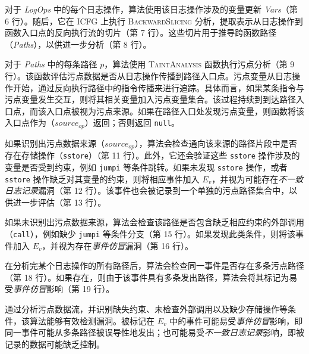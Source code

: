 对于 \textit{LogOps} 中的每个日志操作，算法使用该日志操作涉及的变量更新 \textit{Vars}（第 6 行）。随后，它在 ICFG 上执行 \textsc{BackwardSlicing} 分析，提取表示从日志操作到函数入口点的反向执行流的切片（第 7 行）。这些切片用于推导跨函数路径（\textit{Paths}），以供进一步分析（第 8 行）。

对于 \textit{Paths} 中的每条路径 \(p\)，算法使用 \textsc{TaintAnalysis} 函数执行污点分析（第 9 行）。该函数评估污点数据是否从日志操作传播到路径入口点。污点变量从日志操作开始，通过反向执行路径中的指令传播来进行追踪。具体而言，如果某条指令与污点变量发生交互，则将其相关变量加入污点变量集合。该过程持续到到达路径入口点，而该入口点被视为污点来源。如果在路径入口处发现污点变量，则函数将该入口点作为（\(source_{op}\)）返回；否则返回 \texttt{null}。

如果识别出污点数据来源（\(source_{op}\)），算法会检查通向该来源的路径片段中是否存在存储操作（\texttt{sstore}）（第 11 行）。此外，它还会验证这些 \texttt{sstore} 操作涉及的变量是否受到约束，例如 \texttt{jumpi} 等条件跳转。如果未发现 \texttt{sstore} 操作，或者 \texttt{sstore} 操作缺乏对其变量的约束，则将相应事件加入 \(E_v\)，并视为可能存在\emph{不一致日志记录}漏洞（第 12 行）。该事件也会被记录到一个单独的污点路径集合中，以供进一步评估（第 13 行）。

如果未识别出污点数据来源，算法会检查该路径是否包含缺乏相应约束的外部调用（\texttt{call}），例如缺少 \texttt{jumpi} 等条件分支（第 15 行）。如果发现此类条件，则将该事件加入 \(E_v\)，并视为存在\emph{事件仿冒}漏洞（第 16 行）。

在分析完某个日志操作的所有路径后，算法会检查同一事件是否存在多条污点路径（第 18 行）。如果存在，则由于该事件具有多条发出路径，算法会将其标记为易受\emph{事件仿冒}影响（第 19 行）。

通过分析污点数据流，并识别缺失约束、未检查外部调用以及缺少存储操作等条件，该算法能够有效检测漏洞。被标记在 \(E_v\) 中的事件可能易受\emph{事件仿冒}影响，即同一事件可能从多条路径被误导性地发出；也可能易受\emph{不一致日志记录}影响，即被记录的数据可能缺乏控制。




